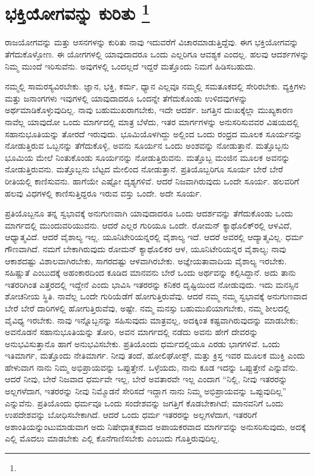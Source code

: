 
\chapter[ಭಕ್ತಿಯೋಗವನ್ನು ಕುರಿತು ]{ಭಕ್ತಿಯೋಗವನ್ನು ಕುರಿತು \protect\footnote{}}

ರಾಜಯೋಗವನ್ನು ಮತ್ತು ಆಸನಗಳನ್ನು ಕುರಿತು ನಾವು ಇದುವರೆಗೆ ವಿಚಾರಮಾಡುತ್ತಿದ್ದೆವು. ಈಗ ಭಕ್ತಿಯೋಗವನ್ನು ತೆಗೆದುಕೊಳ್ಳೋಣ. ಈ ಯೋಗಗಳಲ್ಲಿ ಯಾವುದಾದರೂ ಒಂದು ಎಲ್ಲರಿಗೂ ಆವಶ್ಯಕ ಎಂದಲ್ಲ. ಹಲವು ಆದರ್ಶಗಳನ್ನು ನಿಮ್ಮ ಮುಂದೆ ಇರಿಸುವೆನು. ಅವುಗಳಲ್ಲಿ ಒಂದಲ್ಲದೆ ಇದ್ದರೆ ಮತ್ತೊಂದು ನಿಮಗೆ ಹಿಡಿಸಬಹುದು.

ನಮ್ಮಲ್ಲಿ ಸಾಮರಸ್ಯವಿರಬೇಕು. ಜ್ಞಾನ, ಭಕ್ತಿ, ಕರ್ಮ, ಧ್ಯಾನ ಎಲ್ಲವೂ ನಮ್ಮಲ್ಲಿ ಸಮ\break ತೂಕದಲ್ಲಿ ಸೇರಿರಬೇಕು. ವ್ಯಕ್ತಿಗಳು ಮತ್ತು ಜನಾಂಗಗಳು ಇವುಗಳಲ್ಲಿ ಯಾವುದಾದರೂ ಒಂದನ್ನೇ ತೆಗೆದುಕೊಂಡು ಉಳಿದವುಗಳನ್ನು ಅರ್ಥಮಾಡಿಕೊಳ್ಳುವುದಿಲ್ಲ. ನಾವು ಬಹು\break ಮುಖರಾಗಬೇಕು, ಇದೇ ಆದರ್ಶ. ಜಗತ್ತಿನ ದುಃಖಕ್ಕೆಲ್ಲಾ ಮುಖ್ಯಕಾರಣ ನಾವೆಲ್ಲ ಯಾವುದೋ ಒಂದು ಮಾರ್ಗದಲ್ಲಿ ಮಾತ್ರ ಬೆಳೆದು, ಇತರ ಮಾರ್ಗಗಳನ್ನು ಅನುಸರಿಸು\break ವವರ ವಿಷಯದಲ್ಲಿ ಸಹಾನುಭೂತಿಯನ್ನು ತೋರದೆ ಇರುವುದು. ಭೂಮಿಯೊಳಗಿದ್ದು ಅಲ್ಲಿಂದ ಒಂದು ರಂಧ್ರದ ಮೂಲಕ ಸೂರ್ಯನನ್ನು ನೋಡುತ್ತಿರುವ ಒಬ್ಬನನ್ನು ತೆಗೆದುಕೊಳ್ಳಿ, ಅವನು ಸೂರ್ಯನ ಒಂದು ಅಂಶವನ್ನು ನೋಡುತ್ತಾನೆ. ಮತ್ತೊಬ್ಬನು ಭೂಮಿಯ ಮೇಲೆ ನಿಂತುಕೊಂಡು ಸೂರ್ಯನನ್ನು ನೋಡುತ್ತಿರುವನು. ಮತ್ತೊಬ್ಬ ಮಂಜಿನ ಮೂಲಕ ಅವನನ್ನು ನೋಡುತ್ತಿರುವನು. ಮತ್ತೊಬ್ಬನು ಬೆಟ್ಟದ ಮೇಲಿಂದ ನೋಡುತ್ತಾನೆ. ಪ್ರತಿಯೊಬ್ಬರಿಗೂ ಸೂರ್ಯ ಬೇರೆ ಬೇರೆ ರೀತಿಯಲ್ಲಿ ಕಾಣಿಸುವನು. ಹಾಗೆಯೇ ಎಷ್ಟೋ ದೃಶ್ಯಗಳಿವೆ. ಆದರೆ ನಿಜವಾಗಿರುವುದು ಒಂದೇ ಸೂರ್ಯ. ಹಲವರಿಗೆ ಹಲವು ವಿಧಗಳಲ್ಲಿ ಕಾಣಿಸುತ್ತಿದ್ದರೂ ಇರುವ ವಸ್ತು ಒಂದೇ. ಅದೇ ಸೂರ್ಯ.

ಪ್ರತಿಯೊಬ್ಬನೂ ತನ್ನ ಸ್ವಭಾವಕ್ಕೆ ಅನುಗುಣವಾಗಿ ಯಾವುದಾದರೂ ಒಂದು ಆದರ್ಶವನ್ನು ತೆಗೆದುಕೊಂಡು ಒಂದು ಮಾರ್ಗದಲ್ಲಿ ಮುಂದುವರಿಯುವನು. ಆದರೆ ಎಲ್ಲರ ಗುರಿಯೂ ಒಂದೇ. ರೋಮನ್​ ಕ್ಯಾಥೊಲಿಕ್​ರಲ್ಲಿ ಆಳವಿದೆ, ಆಧ್ಯಾತ್ಮವಿದೆ. ಆದರೆ ವೈಶಾಲ್ಯ ಇಲ್ಲ. ಯೂನಿಟೇರಿಯನ್ನರಲ್ಲಿ ವೈಶಾಲ್ಯ ಇದೆ. ಆದರೆ ಅವರಲ್ಲಿ ಆದ್ಯಾತ್ಮವಿಲ್ಲ. ಧರ್ಮ ಗೌಣವಾಗಿದೆ. ನಮಗೆ ಬೇಕಾಗಿರುವುದು ರೋಮನ್​ ಕ್ಯಾಥೊಲಿಕರ ಆಳ, ಯೂನಿಟೇರಿಯನ್ನರ ವೈಶಾಲ್ಯ; ನಾವು ಆಕಾಶದಷ್ಟು ವಿಶಾಲವಾಗಿರಬೇಕು, ಸಾಗರದಷ್ಟು ಆಳವಾಗಿರಬೇಕು. ಅಜ್ಞೇಯತಾವಾದಿಯ ವೈಶಾಲ್ಯ ಇರಬೇಕು. ಸಹಿಷ್ಣುತೆ ಎಂಬುದಕ್ಕೆ ಅಹಂಕಾರದಿಂದ ಕೂಡಿದ ಮಾನವನು ಬೇರೆ ಒಂದು ಅರ್ಥವನ್ನು ಕಲ್ಪಿಸಿದ್ದಾನೆ. ಅದು ತಾನು ಇತರರಿಗಿಂತ ಎತ್ತರದಲ್ಲಿ ಇದ್ದೇನೆ ಎಂದು ಭಾವಿಸಿ ಇತರರನ್ನು ಕನಿಕರ ದೃಷ್ಟಿಯಿಂದ ನೋಡುವುದು. ಇದು ಮನಸ್ಸಿನ ಶೋಚನೀಯ ಸ್ಥಿತಿ. ನಾವೆಲ್ಲ ಒಂದೇ ಗುರಿಯೆಡೆಗೆ ಹೋಗುತ್ತಿರುವೆವು. ಆದರೆ ನಮ್ಮ ನಮ್ಮ ಸ್ವಭಾವಕ್ಕೆ ಅನುಗುಣವಾದ ಬೇರೆ ಬೇರೆ ದಾರಿಗಳಲ್ಲಿ ಹೋಗುತ್ತಿರುವೆವು, ಅಷ್ಟೇ. ನಮ್ಮ ಮನಸ್ಸು ಬಹುಮುಖಿಯಾಗಬೇಕು, ನಮ್ಮ ಶೀಲದಲ್ಲಿ ವೈವಿಧ್ಯ ಇರಬೇಕು. ನಾವು ಇನ್ನೊಬ್ಬನನ್ನು ಸಹಿಸುವುದು ಮಾತ್ರವಲ್ಲ, ಅದಕ್ಕಿಂತ ಕಷ್ಟವಾಗಿರುವುದನ್ನು ಮಾಡಬೇಕು; ಅವನೊಡನೆ ಸಹಾನುಭೂತಿಯನ್ನು ತೋರಿ, ಅವನ ಮಾರ್ಗದಲ್ಲಿ ನಡೆದು ಅವನು ಹೇಗೆ ದೇವರನ್ನು ಅನುಭವಿಸುತ್ತಾನೊ ಹಾಗೆ ಅನುಭವಿಸಬೇಕು. ಪ್ರತಿಯೊಂದು ಧರ್ಮದಲ್ಲಿಯೂ ಎರಡು ಭಾಗಗಳಿವೆ. ಒಂದು ಇತಿಮಾರ್ಗ, ಮತ್ತೊಂದು ನೇತಿಮಾರ್ಗ. ನೀವು ತಂದೆ, ಹೋಲಿಘೋಸ್ಟ್​, ಮತ್ತು ಕ್ರಿಸ್ತ ಇವರ ಮೂಲಕ ಮುಕ್ತಿ ಎಂದು ಹೇಳುವಾಗ ನಾನು ನಿಮ್ಮ ಅಭಿಪ್ರಾಯವನ್ನು ಒಪ್ಪುತ್ತೇನೆ. ಒಳ್ಳೆಯದು, ನಾನು ಕೂಡ ಇದನ್ನು ಒಪ್ಪುತ್ತೇನೆ ಎನ್ನುವೆನು. ಆದರೆ ನೀವು, ಬೇರೆ ನಿಜವಾದ ಧರ್ಮವೇ ಇಲ್ಲ, ಬೇರೆ ಅವತಾರವೇ ಇಲ್ಲ ಎಂದಾಗ “ನಿಲ್ಲಿ, ನೀವು ಇತರರನ್ನು ಅಲ್ಲಗಳೆದಾಗ, ಇತರರನ್ನು ನೀವು ನಿಮ್ಮೊಡನೆ ಸೇರಿಸದೆ ಇದ್ದಾಗ ನಾನು ನಿಮ್ಮ ಅಭಿಪ್ರಾಯವನ್ನು ಒಪ್ಪುವುದಿಲ್ಲ” ಎನ್ನುವೆನು. ಪ್ರತಿಯೊಂದು ಧರ್ಮವೂ ಒಂದು ಸಂದೇಶವನ್ನು ಜಗತ್ತಿಗೆ ಕೊಡಬೇಕಾಗಿದೆ; ಮಾನವನಿಗೆ ಒಂದು ಉಪದೇಶವನ್ನು ಬೋಧಿಸಬೇಕಾಗಿದೆ. ಆದರೆ ಒಂದು ಧರ್ಮ ಇತರರನ್ನು ಅಲ್ಲಗಳೆದಾಗ, ಇತರರಿಗೆ ಅಶಾಂತಿಯನ್ನುಂಟುಮಾಡುವಾಗ ಅದು ನಿಷೇಧಾತ್ಮಕವಾದ ಅಪಾಯಕರವಾದ ಮಾರ್ಗವನ್ನು ಅನುಸರಿಸುವುದು, ಅದಕ್ಕೆ ಎಲ್ಲಿ ಮೊದಲು ಮಾಡಬೇಕು ಎಲ್ಲಿ ಕೊನೆಗಾಣಿಸಬೇಕು ಎಂಬುದು ಗೊತ್ತಿರುವುದಿಲ್ಲ.

